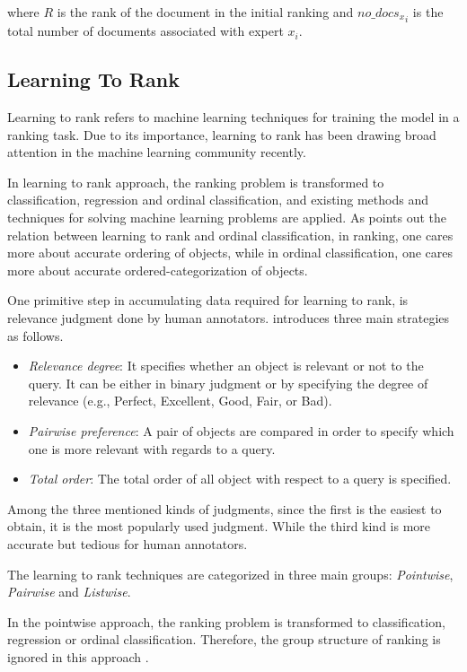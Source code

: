 \noindent 
where $R$ is the rank of the document in the initial ranking and ${no\_docs_x}_i$ is the total number of documents associated with expert $x_i$.

\subsection{Learning To Rank}
Learning to rank refers to machine learning techniques for training the model in a ranking task. Due to its importance, learning to rank has been drawing broad attention in the machine learning community recently. 

In learning to rank approach, the ranking problem is transformed to classification, regression and ordinal classification, and existing methods and techniques for solving machine learning problems are applied. As \citet{l2r-intro} points out the relation between learning to rank and ordinal classification, in ranking, one cares more about accurate ordering of objects, while in ordinal classification, one cares more about accurate ordered-categorization of objects.

One primitive step in accumulating data required for learning to rank, is relevance judgment done by human annotators. \citet{l2r-book} introduces three main strategies as follows.
\begin{itemize}
\item \textit{Relevance degree}: It specifies whether an object is relevant or not to the query. It can be either in binary judgment or by specifying the degree of relevance (e.g., Perfect, Excellent, Good, Fair, or Bad).
\item \textit{Pairwise preference}: A pair of objects are compared in order to specify which one is more relevant with regards to a query.
\item \textit{Total order}: The total order of all object with respect to a query is specified.
\end{itemize}

Among the three mentioned kinds of judgments, since the first is the easiest to obtain, it is the most popularly used judgment. While the third kind is more accurate but tedious for human annotators.

The learning to rank techniques are categorized in three main groups: \textit{Pointwise}, \textit{Pairwise} and \textit{Listwise}.

In the pointwise approach, the ranking problem is transformed to classification, regression or ordinal classification. Therefore, the group structure of ranking is ignored in this approach \citep{l2r-intro}.

